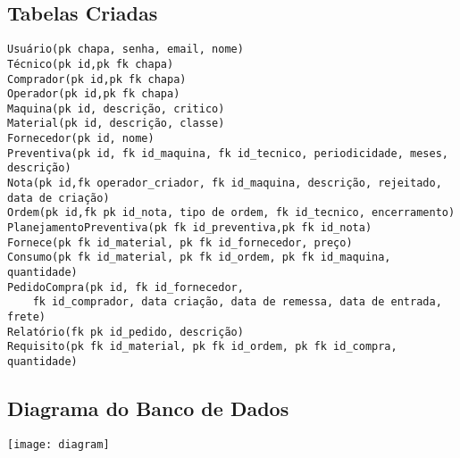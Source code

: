\pagebreak

\subsection{Tabelas Criadas}
\begin{FlushLeft}
    \begin{verbatim}
Usuário(pk chapa, senha, email, nome) 
Técnico(pk id,pk fk chapa)
Comprador(pk id,pk fk chapa)
Operador(pk id,pk fk chapa)
Maquina(pk id, descrição, critico)
Material(pk id, descrição, classe)
Fornecedor(pk id, nome)
Preventiva(pk id, fk id_maquina, fk id_tecnico, periodicidade, meses, descrição)
Nota(pk id,fk operador_criador, fk id_maquina, descrição, rejeitado, data de criação)
Ordem(pk id,fk pk id_nota, tipo de ordem, fk id_tecnico, encerramento)
PlanejamentoPreventiva(pk fk id_preventiva,pk fk id_nota)
Fornece(pk fk id_material, pk fk id_fornecedor, preço)
Consumo(pk fk id_material, pk fk id_ordem, pk fk id_maquina, quantidade)
PedidoCompra(pk id, fk id_fornecedor, 
    fk id_comprador, data criação, data de remessa, data de entrada, frete)
Relatório(fk pk id_pedido, descrição)
Requisito(pk fk id_material, pk fk id_ordem, pk fk id_compra, quantidade)
\end{verbatim}
\end{FlushLeft}

\subsection{Diagrama do Banco de Dados}

\texttt{[image: diagram]}


\pagebreak
